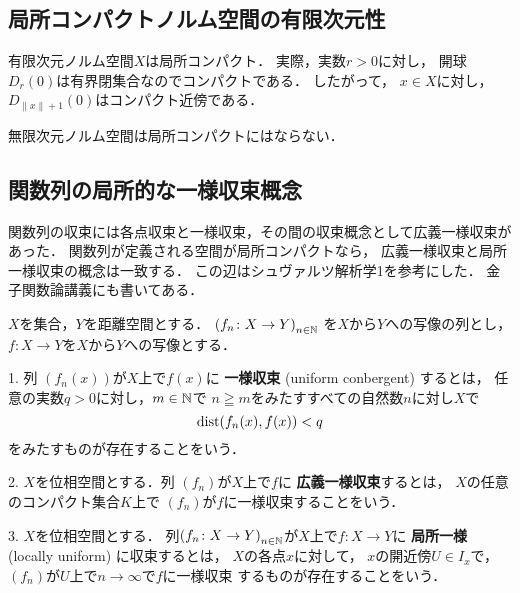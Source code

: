 \subsection{局所コンパクトノルム空間の有限次元性}

有限次元ノルム空間\(X\)は局所コンパクト．
実際，実数\(r>0\)に対し，
開球\(D_r(0)\)は有界閉集合なのでコンパクトである．
したがって，
\(x\in X\)に対し，\(D_{\lVert x\rVert +1}(0)\)はコンパクト近傍である．

無限次元ノルム空間は局所コンパクトにはならない．\cite{Shw67}


\subsection{関数列の局所的な一様収束概念}
関数列の収束には各点収束と一様収束，その間の収束概念として広義一様収束があった．
関数列が定義される空間が局所コンパクトなら，
広義一様収束と局所一様収束の概念は一致する．
この辺はシュヴァルツ解析学1を参考にした．
金子関数論講義にも書いてある．
\begin{leftbar}
\begin{DFN}
    \(X\)を集合，\(Y\)を距離空間とする．
    \(
        \left(f_n\colon X\to Y\right)_{n\in \mathbb{N}}
    \)
    を\(X\)から\(Y\)への写像の列とし，
    \(f\colon X\to Y\)を\(X\)から\(Y\)への写像とする．

    1.  
    列
    \(\left(f_n(x)\right)\)が\(X\)上で\(f(x)\)に
    \textbf{一様収束} (uniform conbergent) するとは，
    任意の実数\(q>0\)に対し，\(m\in\mathbb{N}\)で
    \(n\geqq m\)をみたすすべての自然数\(n\)に対し\(X\)で
    \[
        \mathop{\mathrm{dist}}\nolimits(f_n(x),f(x))<q
    \]
    をみたすものが存在することをいう．

    2. 
    \(X\)を位相空間とする．列
    \(\left(f_n\right)\)が\(X\)上で\(f\)に
    \textbf{広義一様収束}\footnotemark[1]するとは，
    \(X\)の任意のコンパクト集合\(K\)上で
    \(\left(f_n\right)\)が\(f\)に一様収束することをいう．

    3. 
    \(X\)を位相空間とする．
    列\(
        \left(f_n\colon X\to Y\right)_{n\in \mathbb{N}}
    \)が\(X\)上で\(f\colon X\to Y\)に
    \textbf{局所一様} (locally uniform) に収束するとは，
    \(X\)の各点\(x\)に対して，
    \(x\)の開近傍\(U\in I_x\)で，
    \((f_n)\)が\(U\)上で\(n\to\infty\)で\(f\)に一様収束
    するものが存在することをいう．
\end{DFN}
\end{leftbar}

